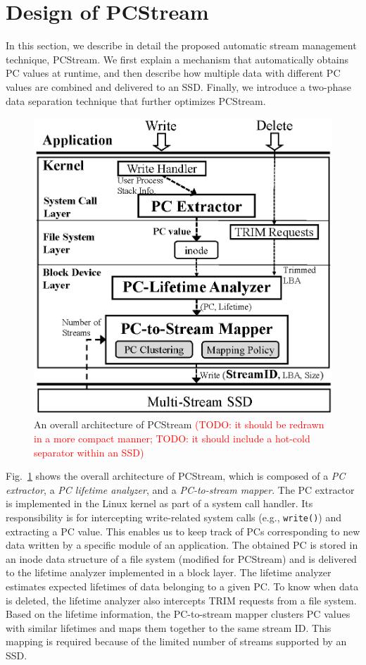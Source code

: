 \section{Design of PCStream}
In this section, we describe in detail the proposed automatic stream management
technique, {\sf PCStream}.  We first explain a mechanism that automatically
obtains PC values at runtime, and then describe how multiple data with
different PC values are combined and delivered to an SSD. Finally, we introduce
a two-phase data separation technique that further optimizes {\sf PCStream}.

\begin{figure}[t]
	\centering
	\includegraphics[width=0.8\linewidth]{figure/architecture3}
	\vspace{-10pt}
	\caption{An overall architecture of {\sf PCStream} 
	\textcolor{red}{(TODO: it should be redrawn in a more compact manner;
	TODO: it should include a hot-cold separator within an SSD)}
	}
	\label{fig:architecture}
	\vspace{-10pt}
\end{figure}

Fig.~\ref{fig:architecture} shows the overall architecture of {\sf PCStream},
which is composed of a \textit{PC extractor}, a \textit{PC lifetime analyzer},
and a \textit{PC-to-stream mapper}.  The PC extractor is implemented in the
Linux kernel as part of a system call handler. Its responsibility is for
intercepting write-related system calls (e.g., \texttt{write()}) and extracting
a PC value.  This enables us to keep track of PCs corresponding to new data
written by a specific module of an application.  The obtained PC is stored in
an inode data structure of a file system (modified for \textsf{PCStream}) and
is delivered to the lifetime analyzer implemented in a block layer.  The
lifetime analyzer estimates expected lifetimes of data belonging to a given PC.
To know when data is deleted, the lifetime analyzer also intercepts TRIM
requests from a file system.  Based on the lifetime information, the
PC-to-stream mapper clusters PC values with similar lifetimes and maps them
together to the same stream ID.  This mapping is required because of the
limited number of streams supported by an SSD.


